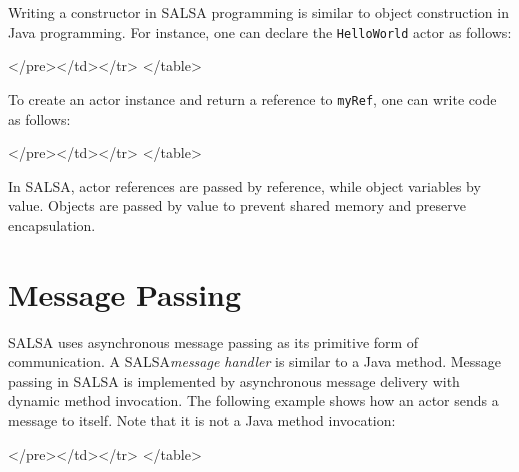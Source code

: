 Writing a constructor in SALSA 
programming is similar 
to object construction in Java programming. 
For instance, one can declare the {\tt HelloWorld}
actor as follows:

{\singlespace

}
\begin{htmlonly}

 \begin{rawhtml} 
   </pre></td></tr>
  </table>
\end{rawhtml} 
\end{htmlonly} 



To create an actor instance and return a reference to 
{\tt myRef}, one can write code as follows:
{\singlespace

}
\begin{htmlonly}

 \begin{rawhtml} 
   </pre></td></tr>
  </table>
\end{rawhtml} 
\end{htmlonly} 

In SALSA, actor 
references are passed by reference, while object 
variables by value. Objects are passed by value to 
prevent shared memory and preserve encapsulation.

\section{Message Passing}
SALSA uses asynchronous message passing as its primitive form of communication. 
A SALSA\textit{message handler} is similar to a Java method.
Message passing in SALSA is implemented by  
asynchronous message delivery with 
dynamic method invocation. The following example 
shows how an actor sends a message to itself. 
Note that it is not a Java method invocation:
{\singlespace

}
\begin{htmlonly}

 \begin{rawhtml} 
   </pre></td></tr>
  </table>
\end{rawhtml} 
\end{htmlonly} 


